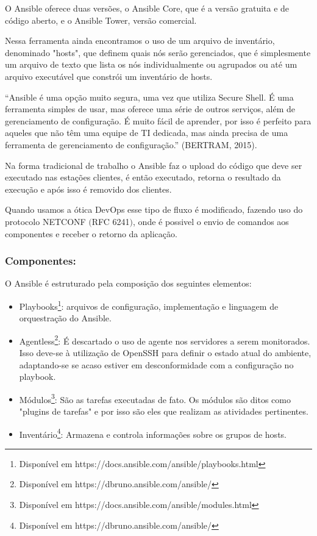 O Ansible oferece duas versões, o Ansible Core, que é a versão gratuita e de código aberto, e o Ansible Tower, versão comercial.

Nessa ferramenta ainda encontramos o uso de um arquivo de inventário, denominado "hosts", que definem quais nós serão gerenciados, que é simplesmente um arquivo de texto que lista os nós individualmente 
ou agrupados ou até um arquivo executável que constrói um inventário de hosts.
			\begin{flushright}
				\begin{minipage}{0.75\textwidth}
					“Ansible é uma opção muito segura, uma vez que utiliza Secure Shell. É uma ferramenta simples de usar, mas oferece uma série de outros serviços, além de gerenciamento de configuração. É muito fácil de aprender, por isso é perfeito para aqueles que não têm uma equipe de TI dedicada, mas ainda precisa de uma ferramenta de gerenciamento de configuração.” (BERTRAM, 2015).
				\end{minipage}
			\end{flushright}

Na forma tradicional de trabalho o Ansible faz o upload do código que deve ser executado nas estações clientes, é então executado, retorna o resultado da execução e após isso é removido dos clientes.

Quando usamos a ótica DevOps esse tipo de fluxo é modificado, fazendo uso do protocolo NETCONF $($RFC 6241$)$, onde é possivel o envio de comandos aos componentes e receber o retorno da aplicação.

\subsubsection{Componentes:}
O Ansible é estruturado pela composição dos seguintes elementos:

\begin{itemize}
	\item Playbooks\footnote{Disponível em https://docs.ansible.com/ansible/playbooks.html}: arquivos de configuração, implementação e linguagem de orquestração do Ansible.
	\item Agentless\footnote{Disponível em https://dbruno.ansible.com/ansible/}: É descartado o uso de agente nos servidores a serem monitorados. Isso deve-se à utilização de OpenSSH para definir o estado atual do ambiente, adaptando-se se acaso estiver em desconformidade com a configuração no playbook.
	\item Módulos\footnote{Disponível em https://docs.ansible.com/ansible/modules.html}: São as tarefas executadas de fato. Os módulos são ditos como "plugins de tarefas" e por isso são eles que realizam as atividades pertinentes.
	\item Inventário\footnote{Disponível em https://dbruno.ansible.com/ansible/}: Armazena e controla informações sobre os grupos de hosts.
\end{itemize}

